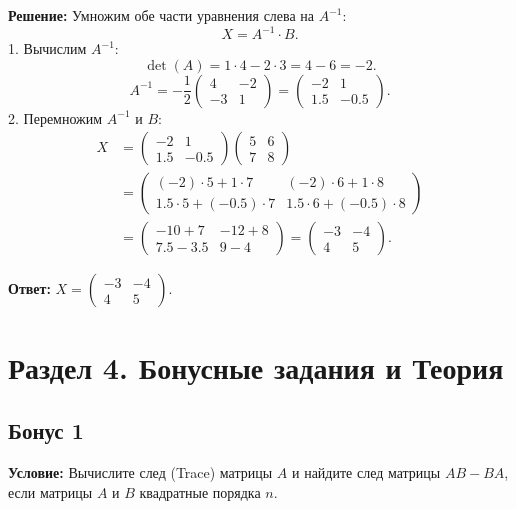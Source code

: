 \documentclass[11pt, a4paper]{article}
\begin{document}
\textbf{Решение:}
Умножим обе части уравнения слева на $A^{-1}$:
$$ X = A^{-1} \cdot B. $$
1. Вычислим $A^{-1}$:
$$ \det(A) = 1 \cdot 4 - 2 \cdot 3 = 4 - 6 = -2. $$
$$ A^{-1} = -\frac{1}{2} \begin{pmatrix} 4 & -2 \\ -3 & 1 \end{pmatrix} = \begin{pmatrix} -2 & 1 \\ 1.5 & -0.5 \end{pmatrix}. $$
2. Перемножим $A^{-1}$ и $B$:
\begin{align*}
X &= \begin{pmatrix} -2 & 1 \\ 1.5 & -0.5 \end{pmatrix} \begin{pmatrix} 5 & 6 \\ 7 & 8 \end{pmatrix} \\
&= \begin{pmatrix} (-2)\cdot 5 + 1\cdot 7 & (-2)\cdot 6 + 1\cdot 8 \\ 1.5\cdot 5 + (-0.5)\cdot 7 & 1.5\cdot 6 + (-0.5)\cdot 8 \end{pmatrix} \\
&= \begin{pmatrix} -10 + 7 & -12 + 8 \\ 7.5 - 3.5 & 9 - 4 \end{pmatrix} = \begin{pmatrix} -3 & -4 \\ 4 & 5 \end{pmatrix}.
\end{align*}

\textbf{Ответ:} $X = \begin{pmatrix} -3 & -4 \\ 4 & 5 \end{pmatrix}$.

\newpage

\section{Раздел 4. Бонусные задания и Теория}

\subsection*{Бонус 1}
\textbf{Условие:} Вычислите след (Trace) матрицы $A$ и найдите след матрицы $AB - BA$, если матрицы $A$ и $B$ квадратные порядка $n$.
\end{document}
